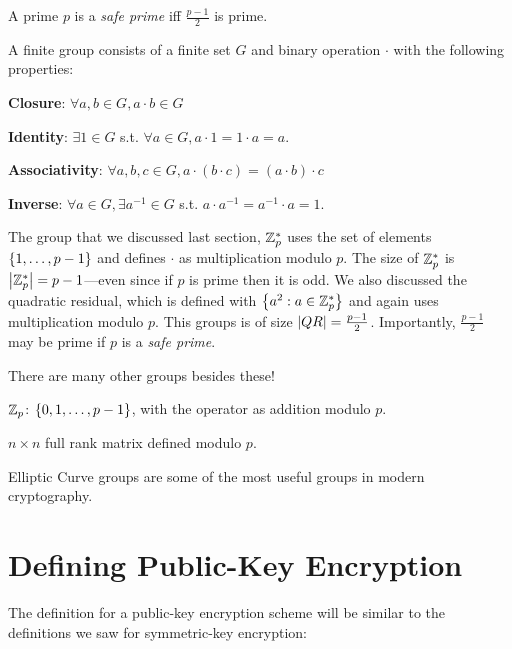 \begin{definition}
	A prime $p$ is a \emph{safe prime} iff $\tfrac{p-1}{2}$ is prime.
\end{definition}

\begin{definition}
	A finite group consists of a finite set $G$ and binary operation $\cdot$ with the following properties:
	\begin{compactenum}
		\item \textbf{Closure}: $\forall a, b \in G, a \cdot b \in G$
		\item \textbf{Identity}: $\exists 1 \in G$  s.t. $\forall a \in G, a\cdot 1 = 1\cdot a = a$.
		\item \textbf{Associativity}: $\forall a, b, c \in G, a\cdot (b \cdot c) = (a \cdot b) \cdot c$
		\item \textbf{Inverse}: $\forall a \in G, \exists a^{-1} \in G$ s.t. $a\cdot a^{-1} = a^{-1}\cdot a = 1$.
	\end{compactenum}
\end{definition}

The group that we discussed last section, $\mathbb{Z}_p^*$ uses the set of elements $\left\{ 1, \ldots, p-1 \right\}$ and defines $\cdot$ as multiplication modulo $p$. The size of $\mathbb{Z}_p^*$ is $\left| \mathbb{Z}_p^* \right| = p-1$---even since if $p$ is prime then it is odd. We also discussed the quadratic residual, which is defined with $\left\{ a^2: a \in \mathbb{Z}_p^* \right\}$ and again uses multiplication modulo $p$. This groups is of size $\left| QR \right| = \tfrac{p-1}{2}$. Importantly, $\tfrac{p-1}{2}$ may be prime if $p$ is a \emph{safe prime}.

There are many other groups besides these!
\begin{compactitem}
\item $\mathbb{Z}_p$: $\left\{ 0, 1, \ldots, p-1 \right\}$, with the operator as addition modulo $p$.
\item $n \times n$ full rank matrix defined modulo $p$.
\item Elliptic Curve groups are some of the most useful groups in modern cryptography.
\end{compactitem}
\fi

\section{Defining Public-Key Encryption}

The definition for a public-key encryption scheme will be similar to the 
definitions we saw for symmetric-key encryption:


